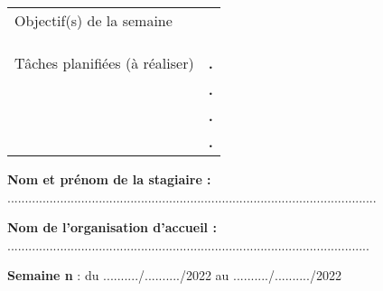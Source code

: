 \documentclass[a4paper,11pt]{article}
\makeatletter
\newcommand{\mktitle}{\@maketitle}
\makeatother
\begin{document}
\begin{center}
\begin{tabular}{|C{6cm}|p{10.3cm}|}
	\hline
	\\
	\hline
	Objectif(s) de la semaine &\\&\\&\\&\\
	\hline
	Tâches planifiées (à réaliser) & \hspace{.2cm}\huge\textbf{.}\\&\hspace{.2cm}\huge\textbf{.}\\&\hspace{.2cm}\huge\textbf{.}\\& \hspace{.2cm}\huge\textbf{.}\\
	\hline
\end{tabular}
\end{center}\newpage

\mktitle\vspace{-.2cm}

\noindent\textbf{Nom et prénom de la stagiaire :} .........................................................................................................\vspace{.4cm}

\noindent\textbf{Nom de l'organisation d'accueil :} .......................................................................................................\vspace{.4cm}

\noindent\textbf{Semaine n} : du ........../........../2022 au ........../........../2022\vspace{-.2cm}
\end{document}
